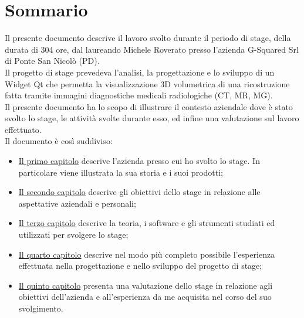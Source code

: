 
\cleardoublepage
{}
{}
\begingroup
\let\clearpage\relax
\let\cleardoublepage\relax
\let\cleardoublepage\relax

\chapter*{Sommario}

Il presente documento descrive il lavoro svolto durante il periodo di stage, della durata di 304 ore, dal laureando Michele Roverato presso l'azienda G-Squared Srl di Ponte San Nicolò (PD).\\
Il progetto di stage prevedeva l'analisi, la progettazione e lo sviluppo di un Widget Qt che permetta la visualizzazione 3D volumetrica di una ricostruzione fatta tramite immagini diagnostiche medicali radiologiche (CT, MR, MG).\\
Il presente documento ha lo scopo di illustrare il contesto aziendale dove è stato svolto lo stage, le attività svolte durante esso, ed infine una valutazione sul lavoro effettuato. \\
Il documento è così suddiviso:
\begin{itemize}
    \item \hyperref[cap:introduzione]{Il primo capitolo} descrive l'azienda presso cui ho svolto lo stage. In particolare viene illustrata la sua storia e i suoi prodotti;
    \item \hyperref[cap:descrizione-stage]{Il secondo capitolo} descrive gli obiettivi dello stage in relazione alle aspettative aziendali e personali;
    \item \hyperref[cap:teoria-stage]{Il terzo capitolo} descrive la teoria, i software e gli strumenti studiati ed utilizzati per svolgere lo stage;
    \item \hyperref[cap:resoconto-stage]{Il quarto capitolo} descrive nel modo più completo possibile l’esperienza effettuata nella progettazione e nello sviluppo del progetto di stage;
	\item \hyperref[cap:conclusioni]{Il quinto capitolo} presenta una valutazione dello stage in relazione agli obiettivi dell'azienda e all'esperienza da me acquisita nel corso del suo svolgimento.
\end{itemize}

\endgroup			

\vfill

